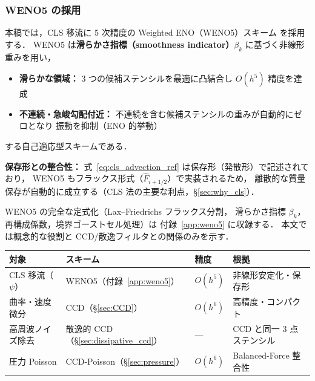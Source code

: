 \subsubsection{WENO5 の採用}

本稿では，CLS 移流に 5 次精度の Weighted ENO（WENO5）スキーム \cite{JiangShu1996} を採用する．
WENO5 は\textbf{滑らかさ指標（smoothness indicator）$\beta_k$} に基づく非線形重みを用い，
\begin{itemize}
  \item \textbf{滑らかな領域：} 3 つの候補ステンシルを最適に凸結合し $O(h^5)$ 精度を達成
  \item \textbf{不連続・急峻勾配付近：} 不連続を含む候補ステンシルの重みが自動的にゼロとなり
        振動を抑制（ENO 的挙動）
\end{itemize}
する自己適応型スキームである．

\textbf{保存形との整合性：}
式~\eqref{eq:cls_advection_ref} は保存形（発散形）で記述されており，
WENO5 もフラックス形式（$\hat{F}_{i+1/2}$）で実装されるため，
離散的な質量保存が自動的に成立する（CLS 法の主要な利点，§\ref{sec:why_cls}）．

\medskip
WENO5 の完全な定式化（Lax--Friedrichs フラックス分割，
滑らかさ指標 $\beta_k$，再構成係数，境界ゴーストセル処理）は
付録~\ref{app:weno5} に収録する．
本文では概念的な役割と CCD/散逸フィルタとの関係のみを示す．

\begin{tcolorbox}[resultbox, title={本稿の空間離散化スキームの役割分担}]
\label{box:scheme_roles}
\begin{center}
\renewcommand{\arraystretch}{1.3}
\begin{tabular}{llll}
\hline
対象 & スキーム & 精度 & 根拠 \\
\hline
CLS 移流（$\psi$） & WENO5（付録~\ref{app:weno5}） & $O(h^5)$ & 非線形安定化・保存形 \\
曲率・速度微分 & CCD（§\ref{sec:CCD}） & $O(h^6)$ & 高精度・コンパクト \\
高周波ノイズ除去 & 散逸的 CCD（§\ref{sec:dissipative_ccd}） & — & CCD と同一 3 点ステンシル \\
圧力 Poisson & CCD-Poisson（§\ref{sec:pressure}） & $O(h^6)$ & Balanced-Force 整合性 \\
\hline
\end{tabular}
\end{center}
\end{tcolorbox}

